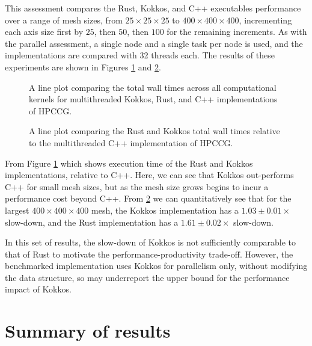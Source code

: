 This assessment compares the Rust, Kokkos, and C++ executables performance over a range of mesh sizes, from $25 \times 25 \times 25$ to $400 \times 400 \times 400$, incrementing each axis size first by $25$, then $50$, then $100$ for the remaining increments. As with the parallel assessment, a single node and a single task per node is used, and the implementations are compared with 32 threads each. The results of these experiments are shown in Figures \ref{fig:16_kokkos_line} and \ref{fig:17_kokkos_line_relative}.

\begin{figure}[H]
    \centering
    
    \caption{A line plot comparing the total wall times across all computational kernels for multithreaded Kokkos, Rust, and C++ implementations of HPCCG.}
    \label{fig:16_kokkos_line}
\end{figure}

\begin{figure}[H]
    \centering
    
    \caption{A line plot comparing the Rust and Kokkos total wall times relative to the multithreaded C++ implementation of HPCCG.}
    \label{fig:17_kokkos_line_relative}
\end{figure}


From Figure \ref{fig:16_kokkos_line} which shows execution time of the Rust and Kokkos implementations, relative to C++. Here, we can see that Kokkos out-performs C++ for small mesh sizes, but as the mesh size grows begins to incur a performance cost beyond C++. From \ref{fig:17_kokkos_line_relative} we can quantitatively see that for the largest $400 \times 400 \times 400$ mesh, the Kokkos implementation has a $1.03 \pm 0.01 \times$ slow-down, and the Rust implementation has a $1.61 \pm 0.02 \times$ slow-down. 

In this set of results, the slow-down of Kokkos is not sufficiently comparable to that of Rust to motivate the performance-productivity trade-off. However, the benchmarked implementation uses Kokkos for parallelism only, without modifying the data structure, so may underreport the upper bound for the performance impact of Kokkos. %


\section{Summary of results}
\label{sec:performance-results}

